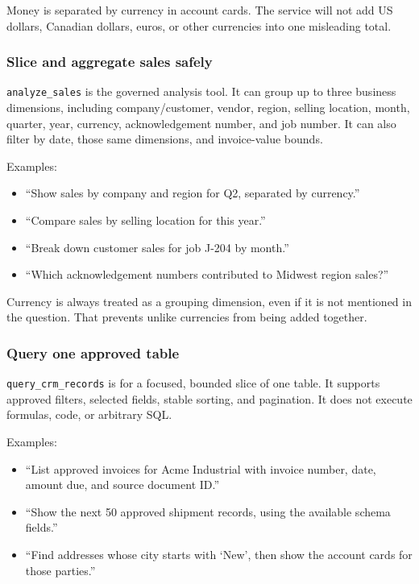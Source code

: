 \documentclass[
]{article}
\providecommand{\tightlist}{%
  \setlength{\itemsep}{0pt}\setlength{\parskip}{0pt}}
\begin{document}
Money is separated by currency in account cards. The service will not
add US dollars, Canadian dollars, euros, or other currencies into one
misleading total.

\subsubsection{Slice and aggregate sales
safely}\label{slice-and-aggregate-sales-safely}

\texttt{analyze\_\allowbreak{}sales} is the governed analysis tool. It
can group up to three business dimensions, including company/customer,
vendor, region, selling location, month, quarter, year, currency,
acknowledgement number, and job number. It can also filter by date,
those same dimensions, and invoice-value bounds.

Examples:

\begin{itemize}
\tightlist
\item
  ``Show sales by company and region for Q2, separated by currency.''
\item
  ``Compare sales by selling location for this year.''
\item
  ``Break down customer sales for job J-204 by month.''
\item
  ``Which acknowledgement numbers contributed to Midwest region sales?''
\end{itemize}

Currency is always treated as a grouping dimension, even if it is not
mentioned in the question. That prevents unlike currencies from being
added together.

\subsubsection{Query one approved table}\label{query-one-approved-table}

\texttt{query\_\allowbreak{}crm\_\allowbreak{}records} is for a focused,
bounded slice of one table. It supports approved filters, selected
fields, stable sorting, and pagination. It does not execute formulas,
code, or arbitrary SQL.

Examples:

\begin{itemize}
\tightlist
\item
  ``List approved invoices for Acme Industrial with invoice number,
  date, amount due, and source document ID.''
\item
  ``Show the next 50 approved shipment records, using the available
  schema fields.''
\item
  ``Find addresses whose city starts with `New', then show the account
  cards for those parties.''
\end{itemize}
\end{document}
